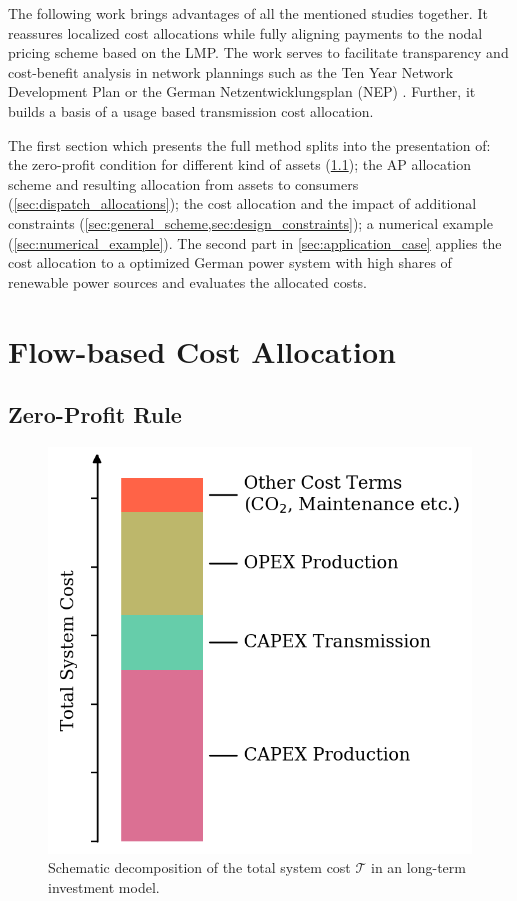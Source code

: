 \documentclass[11pt,twocolumn]{article}
\newcommand{\totalcost}{\mathcal{T}}
\begin{document}
The following work brings advantages of all the mentioned studies together. It reassures localized cost allocations while fully aligning payments to the nodal pricing scheme based on the LMP. The work serves to facilitate transparency and cost-benefit analysis in network plannings such as the Ten Year Network Development Plan \cite{entso-e_completing_2020} or the German Netzentwicklungsplan (NEP) \cite{bundesnetzagentur_netzentwicklungsplan_2020}. Further, it builds a basis of a usage based transmission cost allocation. 

The first section which presents the full method splits into the presentation of: the zero-profit condition for different kind of assets (\cref{sec:zero_profit_rule});  the AP allocation scheme and resulting allocation from assets to consumers (\cref{sec:dispatch_allocations}); the cost allocation and the impact of additional constraints (\cref{sec:general_scheme,sec:design_constraints}); a numerical example (\cref{sec:numerical_example}). The second part in \cref{sec:application_case} applies the cost allocation to a optimized German power system with high shares of renewable power sources and evaluates the allocated costs.  


\section{Flow-based Cost Allocation}

\subsection{Zero-Profit Rule}
\label{sec:zero_profit_rule}

\begin{figure}[h]
    \centering
    \includegraphics[width=.8\linewidth]{cost_decomposition.png}
    \caption{Schematic decomposition of the total system cost $\totalcost$ in an long-term investment model.}
    \label{fig:cost_decomposition}
\end{figure}
    
\end{document}
